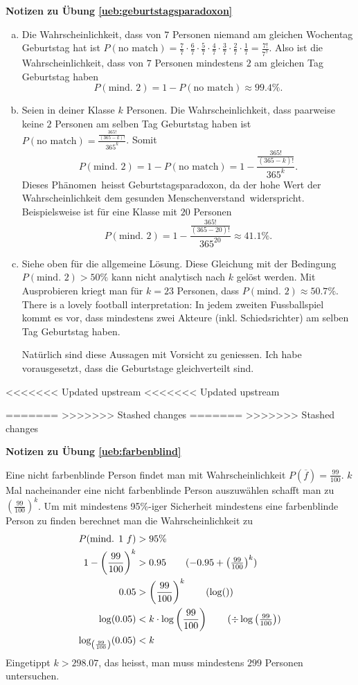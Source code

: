 \documentclass[%
<<<<<<< Updated upstream
<<<<<<< Updated upstream
11pt,%
twoside,%
titlepage,%
german,%
=======
=======
>>>>>>> Stashed changes
11pt,%
twoside,%
titlepage,%
swissgerman,%
<<<<<<< Updated upstream
>>>>>>> Stashed changes
=======
>>>>>>> Stashed changes
headsepline%
]{scrartcl}
\newcommand{\faReturnGray}{\textcolor{gray}{\faMailReply}} %
\newcommand{\definition}[1]{\colorbox{emerald}{#1}}
\theoremstyle{definition}
\theoremstyle{plain}
\newcommand{\concatueb}[1]{ueb:#1}%
\newcommand{\concatlsg}[1]{lsg:#1}%
\newenvironment{lsg}[1]{%
    \par\noindent\textbf{Notizen zu Übung \ref{\concatueb{#1}}}\label{\concatlsg{#1}}
    \hfill\hyperref[\concatueb{#1}]{\faReturnGray}\par %
}{%
    \par%
}
\newcommand{\concatueb}[1]{ueb:#1}%
\newcommand{\concatlsg}[1]{lsg:#1}%
\newenvironment{lsg}[1]{%
    \par\noindent\textbf{Notizen zu Übung \ref{\concatueb{#1}}.}%
    \label{\concatlsg{#1}}
}{%
    \par%
}
\newcommand{\definition}[1]{\colorbox{emerald}{#1}}
\begin{document}
\begin{lsg}{geburtstagsparadoxon}
\begin{enumerate}[a)]
\item Die Wahrscheinlichkeit, dass von $7$ Personen niemand am gleichen Wochentag Geburtstag hat ist $P(\text{no match})=\frac{7}{7}\cdot\frac{6}{7}\cdot\frac{5}{7}\cdot\frac{4}{7}\cdot\frac{3}{7}\cdot\frac{2}{7}\cdot\frac{1}{7}=\frac{7!}{7^{7}}$. Also ist die Wahrscheinlichkeit, dass von $7$ Personen mindestens $2$ am gleichen Tag Geburtstag haben
$$P(\text{mind. 2})=1-P(\text{no match})\approx99.4\%.$$
\item Seien in deiner Klasse $k$ Personen. Die Wahrscheinlichkeit, dass paarweise keine $2$ Personen am selben Tag Geburtstag haben ist $P(\text{no match})=\frac{\frac{365!}{(365-k)!}}{365^{k}}$. Somit
$$P(\text{mind. 2})=1-P(\text{no match})=1-\frac{\frac{365!}{(365-k)!}}{365^{k}}.$$
Dieses \glqq Ph\"anomen\grqq\ heisst \definition{Geburtstagsparadoxon}, da der hohe Wert der Wahrscheinlichkeit dem \glqq gesunden Menschenverstand\grqq\ widerspricht. Beispielsweise ist f\"ur eine Klasse mit $20$ Personen
$$P(\text{mind. 2})=1-\frac{\frac{365!}{(365-20)!}}{365^{20}}\approx41.1\%.$$
\item Siehe oben f\"ur die allgemeine L\"osung. Diese Gleichung mit der Bedingung $P(\text{mind. 2})>50\%$ kann nicht analytisch nach $k$ gel\"ost werden. Mit Ausprobieren kriegt man f\"ur $k=23$ Personen, dass $P(\text{mind. 2})\approx50.7\%$. There is a lovely football interpretation: In jedem zweiten Fussballspiel kommt es vor, dass mindestens zwei Akteure (inkl. Schiedsrichter) am selben Tag Geburtstag haben.

Nat\"urlich sind diese Aussagen mit Vorsicht zu geniessen. Ich habe vorausgesetzt, dass die Geburtstage gleichverteilt sind.
\end{enumerate}
\end{lsg}

<<<<<<< Updated upstream
<<<<<<< Updated upstream

=======
>>>>>>> Stashed changes
=======
>>>>>>> Stashed changes
\begin{lsg}{farbenblind}
Eine nicht farbenblinde Person findet man mit Wahrscheinlichkeit $P(\overline{f})=\frac{99}{100}$. $k$ Mal nacheinander eine nicht farbenblinde Person auszuw\"ahlen schafft man zu $\left(\frac{99}{100}\right)^{k}$. Um mit mindestens 95\%-iger Sicherheit mindestens eine farbenblinde Person zu finden berechnet man die Wahrscheinlichkeit zu
\begin{align*}
P(\text{mind. 1 }f) &> 95\%\\
1-\left(\frac{99}{100}\right)^{k} &> 0.95\tag{$-0.95+\left(\frac{99}{100}\right)^{k}$}\\
0.05 &> \left(\frac{99}{100}\right)^{k} \tag{$\log()$}\\
\log(0.05) &< k\cdot\log\left(\frac{99}{100}\right) \tag{$\div\log\left(\frac{99}{100}\right)$}\\
\log_{\left(\frac{99}{100}\right)}(0.05) &< k
\end{align*}
Eingetippt $k>298.07$, das heisst, man muss mindestens $299$ Personen untersuchen.
\end{lsg}
\end{document}

